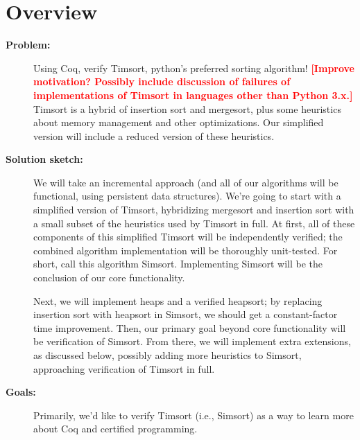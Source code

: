 \documentclass{article}
\newcommand{\todo}[1]{\textcolor{red}{\textbf{\textsf{[#1]}}}}
\begin{document}


\section{Overview}
\begin{description}
  \item[\textbf{Problem:}]
    Using Coq, verify Timsort, python's preferred sorting algorithm!
    \todo{Improve motivation? Possibly include discussion of failures of
    implementations of Timsort in languages other than Python 3.x.}
    Timsort is a hybrid of insertion sort and mergesort, plus some heuristics
    about memory management and other optimizations.
    Our simplified version will include a reduced version of these
    heuristics.

  \item[\textbf{Solution sketch:}]
    We will take an incremental approach (and all of our algorithms
    will be functional, using persistent data structures).
    We're going to start with a
    simplified version of Timsort,
    hybridizing mergesort and insertion sort
    with a small subset of the heuristics used by Timsort in full.
    At first, all of these components of this simplified Timsort will
    be independently verified; the combined algorithm implementation
    will be thoroughly unit-tested.
    For short, call this algorithm Simsort.
    Implementing Simsort will be the conclusion of our core functionality.

    Next, we will implement heaps and a verified heapsort;
    by replacing insertion sort with heapsort in Simsort,
    we should get a constant-factor time improvement.
    Then, our primary goal beyond core functionality will
    be verification of Simsort.
    From there, we will implement extra extensions, as discussed below,
    possibly adding more heuristics to Simsort, approaching verification
    of Timsort in full.

  \item[\textbf{Goals:}]
    Primarily, we'd like to verify Timsort (i.e., Simsort) as a way to
    learn more about Coq and certified programming.

\end{description}
\end{document}
